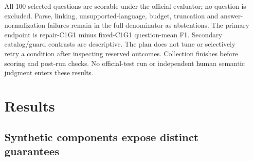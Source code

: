 \documentclass[10pt]{article}
\begin{document}
All 100 selected questions are scorable under the official evaluator; no question is excluded. Parse, linking, unsupported-language, budget, truncation and answer-normalization failures remain in the full denominator as abstentions. The primary endpoint is repair-C1G1 minus fixed-C1G1 question-mean F1. Secondary catalog/guard contrasts are descriptive. The plan does not tune or selectively retry a condition after inspecting reserved outcomes. Collection finishes before scoring and post-run checks. No official-test run or independent human semantic judgment enters these results.\par

\section{Results}

\subsection{Synthetic components expose distinct guarantees}

\begingroup\small\setlength{\tabcolsep}{4pt}
\end{document}
